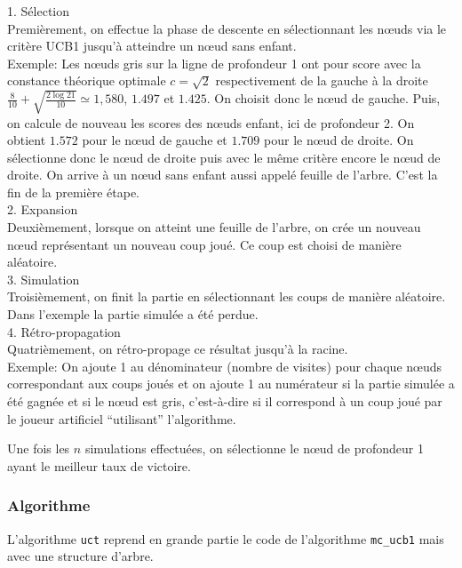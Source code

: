\documentclass[a4paper]{article}
\theoremstyle{definition}
\begin{document}
1. Sélection\\
Premièrement, on effectue la phase de descente en sélectionnant les nœuds via le critère UCB1 jusqu'à atteindre un nœud sans enfant.\\
Exemple: Les nœuds gris sur la ligne de profondeur 1 ont pour score avec la constance théorique optimale $c=\sqrt{2}$ respectivement de la gauche à la droite $\frac{8}{10} + \sqrt{\frac{2\log21}{10}} \simeq 1,580$, $1.497$ et $1.425$. On choisit donc le nœud de gauche. Puis, on calcule de nouveau les scores des nœuds enfant, ici de profondeur 2. On obtient $1.572$ pour le nœud de gauche et $1.709$ pour le nœud de droite. On sélectionne donc le nœud de droite puis avec le même critère encore le nœud de droite. On arrive à un nœud sans enfant aussi appelé feuille de l'arbre. C'est la fin de la première étape.
\\

2. Expansion\\
Deuxièmement, lorsque on atteint une feuille de l'arbre, on crée un nouveau nœud représentant un nouveau coup joué. Ce coup est choisi de manière aléatoire.\\

3. Simulation\\
Troisièmement, on finit la partie en sélectionnant les coups de manière aléatoire. Dans l'exemple la partie simulée a été perdue.\\

4. Rétro-propagation\\
Quatrièmement, on rétro-propage ce résultat jusqu'à la racine.\\
Exemple: On ajoute 1 au dénominateur (nombre de visites) pour chaque nœuds correspondant aux coups joués et on ajoute 1 au numérateur si la partie simulée a été gagnée et si le nœud est gris, c'est-à-dire si il correspond à un coup joué par le joueur artificiel ``utilisant'' l'algorithme.

Une fois les $n$ simulations effectuées, on sélectionne le nœud de profondeur 1 ayant le meilleur taux de victoire.

\subsubsection{Algorithme}

L'algorithme \texttt{uct} reprend en grande partie le code de l'algorithme \texttt{mc\_ucb1} mais avec une structure d'arbre.
\end{document}
